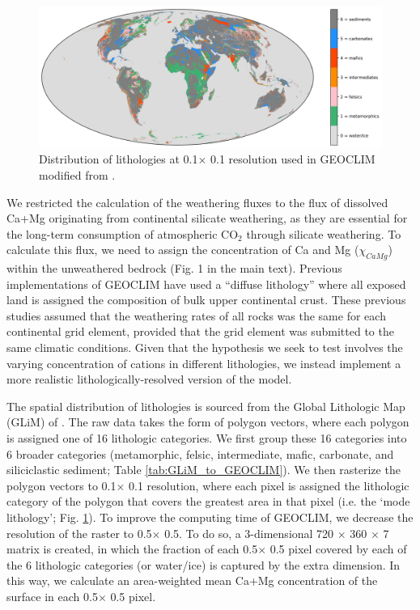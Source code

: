 \documentclass[11pt,letterpaper]{article}
\newcommand{\degrees}{\textdegree\xspace}
\newcommand{\COtwo}{CO$_{2}$\xspace}
\begin{document}
\begin{figure}[h!]
    \centering
    \includegraphics[width=1\textwidth]{Figures/world_lithology.jpg}
    \caption{Distribution of lithologies at 0.1\degrees $\times$ 0.1\degrees resolution used in GEOCLIM modified from \cite{Hartmann2012a}.}
    \label{fig:world_lithology}
\end{figure}

We restricted the calculation of the weathering fluxes to the flux of dissolved Ca+Mg originating from continental silicate weathering, as they are essential for the long-term consumption of atmospheric \COtwo through silicate weathering. To calculate this flux, we need to assign the concentration of Ca and Mg ($\chi_{CaMg}$) within the unweathered bedrock (Fig. 1 in the main text). Previous implementations of GEOCLIM have used a ``diffuse lithology'' where all exposed land is assigned the composition of bulk upper continental crust. These previous studies assumed that the weathering rates of all rocks was the same for each continental grid element, provided that the grid element was submitted to the same climatic conditions. Given that the hypothesis we seek to test involves the varying concentration of cations in different lithologies, we instead implement a more realistic lithologically-resolved version of the model.

The spatial distribution of lithologies is sourced from the Global Lithologic Map (GLiM) of \citet{Hartmann2012a}. The raw data takes the form of polygon vectors, where each polygon is assigned one of 16 lithologic categories. We first group these 16 categories into 6 broader categories (metamorphic, felsic, intermediate, mafic, carbonate, and siliciclastic sediment; Table \ref{tab:GLiM_to_GEOCLIM}). We then rasterize the polygon vectors to 0.1\degrees $\times$ 0.1\degrees resolution, where each pixel is assigned the lithologic category of the polygon that covers the greatest area in that pixel (i.e. the `mode lithology'; Fig. \ref{fig:world_lithology}). To improve the computing time of GEOCLIM, we decrease the resolution of the raster to 0.5\degrees $\times$ 0.5\degrees. To do so, a 3-dimensional 720 $\times$ 360 $\times$ 7 matrix is created, in which the fraction of each 0.5\degrees $\times$ 0.5\degrees pixel covered by each of the 6 lithologic categories (or water/ice) is captured by the extra dimension. In this way, we calculate an area-weighted mean Ca+Mg concentration of the surface in each 0.5\degrees $\times$ 0.5\degrees pixel.
\end{document}
